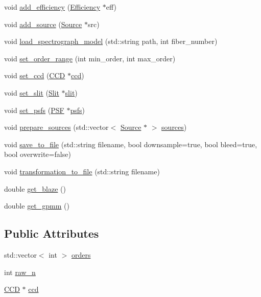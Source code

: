 \begin{DoxyCompactItemize}
\item 
void \hyperlink{class_matrix_simulator_a2caa7f889603addf02db9094c20b91a6}{add\+\_\+efficiency} (\hyperlink{class_efficiency}{Efficiency} $\ast$eff)
\item 
void \hyperlink{class_matrix_simulator_a250a81596cd303057c4d14a86c4bb728}{add\+\_\+source} (\hyperlink{class_source}{Source} $\ast$src)
\item 
void \hyperlink{class_matrix_simulator_a9a9afb06c7285f20658092da61f65c36}{load\+\_\+spectrograph\+\_\+model} (std\+::string path, int fiber\+\_\+number)
\item 
void \hyperlink{class_matrix_simulator_a26d15d1dd2e1e8944e74e5f9f47dca76}{set\+\_\+order\+\_\+range} (int min\+\_\+order, int max\+\_\+order)
\item 
void \hyperlink{class_matrix_simulator_a0741978f171e1c5f229c19de64042958}{set\+\_\+ccd} (\hyperlink{class_c_c_d}{C\+CD} $\ast$\hyperlink{class_matrix_simulator_a151ec381d921be1b5b30fef6430ceb91}{ccd})
\item 
void \hyperlink{class_matrix_simulator_afaf8acf533e2b0e0e440aabbeb6a4743}{set\+\_\+slit} (\hyperlink{class_slit}{Slit} $\ast$\hyperlink{class_matrix_simulator_a5b054ede1af3c6e29296af6f2cd5e313}{slit})
\item 
void \hyperlink{class_matrix_simulator_ad31531aec0901325d6e01ebbd82b1da5}{set\+\_\+psfs} (\hyperlink{class_p_s_f}{P\+SF} $\ast$\hyperlink{class_matrix_simulator_a4f8b1a0772c43203f1b06420c0d018fa}{psfs})
\item 
void \hyperlink{class_matrix_simulator_a042e798c6f289100c88a656f71101502}{prepare\+\_\+sources} (std\+::vector$<$ \hyperlink{class_source}{Source} $\ast$ $>$ \hyperlink{class_matrix_simulator_abb3bc16d0336f6bbda99300ceccdf427}{sources})
\item 
void \hyperlink{class_matrix_simulator_ac7e48c2e271c13b09e5a1c55f6f477c8}{save\+\_\+to\+\_\+file} (std\+::string filename, bool downsample=true, bool bleed=true, bool overwrite=false)
\item 
void \hyperlink{class_matrix_simulator_a8ce41368c573f2faba7e74a5756250e4}{transformation\+\_\+to\+\_\+file} (std\+::string filename)
\item 
double \hyperlink{class_matrix_simulator_abf10a6ad60e8fa959e41df6a1f07c82d}{get\+\_\+blaze} ()
\item 
double \hyperlink{class_matrix_simulator_ab4e1e824d0e819fcf967d7d8b770de8a}{get\+\_\+gpmm} ()
\end{DoxyCompactItemize}
\subsection*{Public Attributes}
\begin{DoxyCompactItemize}
\item 
std\+::vector$<$ int $>$ \hyperlink{class_matrix_simulator_a5524a9a77d30e2b396737260ec6f73f8}{orders}
\item 
int \hyperlink{class_matrix_simulator_a2da306f4e998a609e9a9f26688d80949}{raw\+\_\+n}
\item 
\hyperlink{class_c_c_d}{C\+CD} $\ast$ \hyperlink{class_matrix_simulator_a151ec381d921be1b5b30fef6430ceb91}{ccd}
\end{DoxyCompactItemize}
